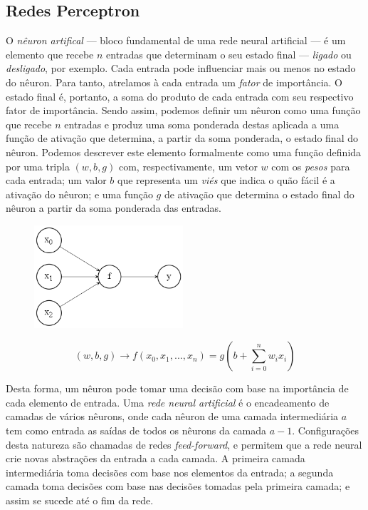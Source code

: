 \documentclass[12pt, a4paper]{article}
\begin{document}
\subsection{Redes Perceptron}
O \emph{nêuron artifical} --- bloco fundamental de uma rede neural artificial --- é um elemento que recebe $n$ entradas que determinam o seu estado final --- \emph{ligado} ou \emph{desligado}, por exemplo. Cada entrada pode influenciar mais ou menos no estado do nêuron. Para tanto, atrelamos à cada entrada um \emph{fator} de importância. O estado final é, portanto, a soma do produto de cada entrada com seu respectivo fator de importância. Sendo assim, podemos definir um nêuron como uma função que recebe $n$ entradas e produz uma soma ponderada destas aplicada a uma função de ativação que determina, a partir da soma ponderada, o estado final do nêuron. Podemos descrever este elemento formalmente como uma função definida por uma tripla $(w, b, g)$ com, respectivamente, um vetor $w$ com os \emph{pesos} para cada entrada; um valor $b$ que representa um \emph{viés} que indica o quão fácil é a ativação do nêuron; e uma função $g$ de ativação que determina o estado final do nêuron a partir da soma ponderada das entradas.

\begin{figure}[ht]
	\centering
	\includegraphics[width=\textwidth, height=3.8cm, keepaspectratio=true]{fig/perceptron}
\end{figure}

\begin{equation}
(w, b, g) \rightarrow f(x_0, x_1, ..., x_n) = g\left(b + \displaystyle\sum_{i=0}^{n} w_i x_i \right)
\end{equation}

Desta forma, um nêuron pode tomar uma decisão com base na importância de cada elemento de entrada. Uma \emph{rede neural artificial} é o encadeamento de camadas de vários nêurons, onde cada nêuron de uma camada intermediária $a$ tem como entrada as saídas de todos os nêurons da camada $a - 1$. Configurações desta natureza são chamadas de redes \emph{feed-forward}, e permitem que a rede neural crie novas abstrações da entrada a cada camada. A primeira camada intermediária toma decisões com base nos elementos da entrada; a segunda camada toma decisões com base nas decisões tomadas pela primeira camada; e assim se sucede até o fim da rede.
\end{document}
